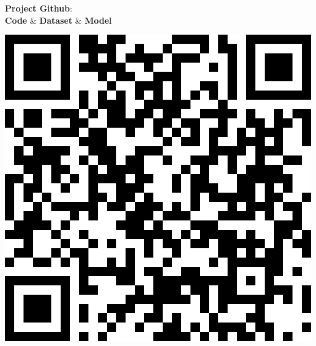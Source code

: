 {\begin{minipage}[c]{\textwidth}
  \end{minipage}
\vspace{2em}
    \begin{minipage}[t]{0.35\linewidth} %
\end{minipage}
\hfill %
\begin{minipage}[t]{0.35\linewidth} %
    \begin{minipage}{0.48\linewidth}
    \vspace{1em}
        \begin{center}
        \textbf{Project Github}: \\
        \vspace{0.5em}\textbf{Code} \& \textbf{Dataset} \& \textbf{Model}
        \end{center}
    \end{minipage}
    \begin{minipage}{0.3\linewidth}
    \vspace{1em}
        \begin{center}
            \includegraphics[width=\linewidth]{logo/paper_qrcode_git.png}
        \end{center}
    \end{minipage}
\end{minipage}

}
